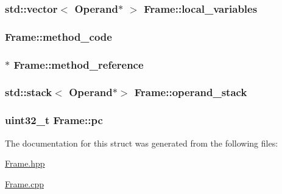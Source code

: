 \subsubsection[{\texorpdfstring{local\+\_\+variables}{local_variables}}]{\setlength{\rightskip}{0pt plus 5cm}std\+::vector$<$ {\bf Operand}$\ast$ $>$ Frame\+::local\+\_\+variables}\hypertarget{struct_frame_aed517b3bbbefabb20d8e990623ac3118}{}\label{struct_frame_aed517b3bbbefabb20d8e990623ac3118}
\subsubsection[{\texorpdfstring{method\+\_\+code}{method_code}}]{ Frame\+::method\+\_\+code}\hypertarget{struct_frame_a7eac6c489fcfc2de43409f405d360a3d}{}\label{struct_frame_a7eac6c489fcfc2de43409f405d360a3d}
\subsubsection[{\texorpdfstring{method\+\_\+reference}{method_reference}}]{$\ast$ Frame\+::method\+\_\+reference}\hypertarget{struct_frame_ad7c3164833be265d690a786a172ca80a}{}\label{struct_frame_ad7c3164833be265d690a786a172ca80a}
\subsubsection[{\texorpdfstring{operand\+\_\+stack}{operand_stack}}]{\setlength{\rightskip}{0pt plus 5cm}std\+::stack$<$ {\bf Operand}$\ast$$>$ Frame\+::operand\+\_\+stack}\hypertarget{struct_frame_a30eaf6634fbadf9dd4c6a8c05b92d3a4}{}\label{struct_frame_a30eaf6634fbadf9dd4c6a8c05b92d3a4}
\subsubsection[{\texorpdfstring{pc}{pc}}]{\setlength{\rightskip}{0pt plus 5cm}uint32\+\_\+t Frame\+::pc}\hypertarget{struct_frame_a91e50d2091184efb52b6d7c0c21fd4b2}{}\label{struct_frame_a91e50d2091184efb52b6d7c0c21fd4b2}


The documentation for this struct was generated from the following files\+:\begin{DoxyCompactItemize}
\item 
\hyperlink{_frame_8hpp}{Frame.\+hpp}\item 
\hyperlink{_frame_8cpp}{Frame.\+cpp}\end{DoxyCompactItemize}
